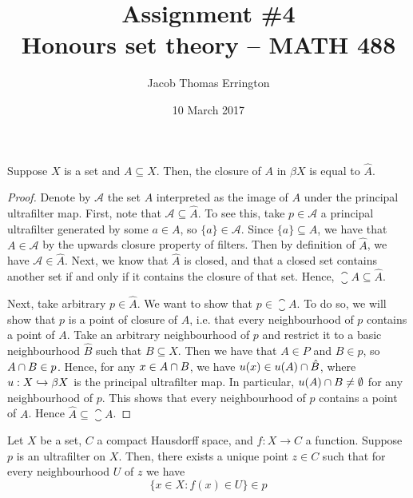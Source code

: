 \documentclass[11pt,letterpaper]{article}
\author{Jacob Thomas Errington}
\title{Assignment \#4\\Honours set theory -- MATH 488}
\date{10 March 2017}
\begin{document}
\maketitle

\begin{prop}
    Suppose $X$ is a set and $A \subseteq X$. Then, the closure of $A$ in
    $\beta X$ is equal to $\hat A$.
\end{prop}

\begin{proof}
    Denote by $\mathcal{A}$ the set $A$ interpreted as the image of $A$ under
    the principal ultrafilter map.
    First, note that $\mathcal{A} \subseteq \hat A$.
    To see this, take $p \in \mathcal{A}$ a principal ultrafilter generated by
    some $a \in A$, so $\{ a \} \in \mathcal{A}$. Since $\{a\} \subseteq A$, we
    have that $A \in \mathcal{A}$ by the upwards closure property of filters.
    Then by definition of $\hat A$, we have $\mathcal{A} \in \hat A$.
    Next, we know that $\hat A$ is closed, and that a closed set contains
    another set if and only if it contains the closure of that set.
    Hence, $\closure{A} \subseteq \hat A$.

    Next, take arbitrary $p \in \hat A$.
    We want to show that $p \in \closure{A}$.
    To do so, we will show that $p$ is a point of closure of $A$,
    i.e. that every neighbourhood of $p$ contains a point of $A$.
    Take an arbitrary neighbourhood of $p$ and restrict it to a basic
    neighbourhood $\hat B$ such that $B \subseteq X$.
    Then we have that $A \in P$ and $B \in p$, so $A \cap B \in p$.
    Hence, for any $x \in A \cap B$,
    we have $u(x) \in u(A) \cap \hat B$,
    where $u : X \hookrightarrow \beta X$ is the principal ultrafilter map.
    In particular, $u(A) \cap B \neq \emptyset$ for any neighbourhood of
    $p$. This shows that every neighbourhood of $p$ contains a point of $A$.
    Hence $\hat A \subseteq \closure{A}$.
\end{proof}

\begin{prop}
    \label{prop:compact-hausdorff-continuous-extension}
    Let $X$ be a set, $C$ a compact Hausdorff space, and $f : X \to C$ a
    function. Suppose $p$ is an ultrafilter on $X$. Then, there exists a unique
    point $z \in C$ such that for every neighbourhood $U$ of $z$ we have
    \begin{equation*}
        \{ x \in X : f (x) \in U \} \in p
    \end{equation*}
\end{prop}
\end{document}
